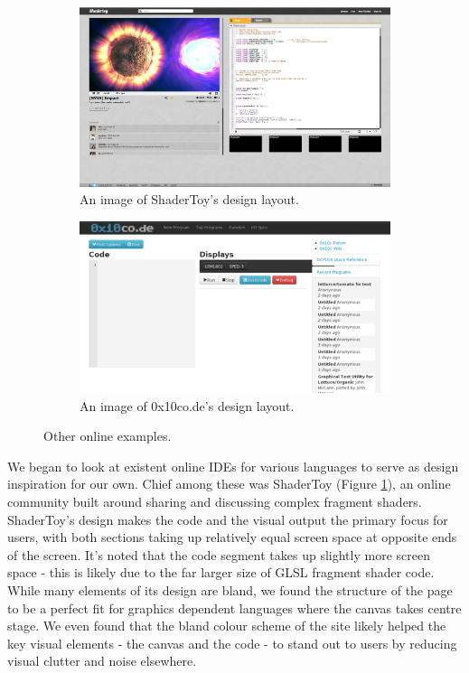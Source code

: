 \documentclass{l3proj}
\begin{document}
\begin{figure}
\centering
\begin{subfigure}[b]{0.45\textwidth}
\includegraphics[width=\textwidth]{images/shadertoy-ide}
\caption{An image of ShaderToy's design layout.}
\label{fig:ide-shadertoy}
\end{subfigure}
\begin{subfigure}[b]{0.45\textwidth}
\includegraphics[width=\textwidth]{images/0x10code}
\caption{An image of 0x10co.de's design layout.}
\label{fig:ide-0x10code}
\end{subfigure}
\caption{Other online examples.}
\label{fig-ide-other}
\end{figure}

We began to look at existent online IDEs for various languages to serve as design inspiration for our own. Chief among these was ShaderToy (Figure \ref{fig:ide-shadertoy}), an online community built around sharing and discussing complex fragment shaders. ShaderToy's design makes the code and the visual output the primary focus for users, with both sections taking up relatively equal screen space at opposite ends of the screen. It's noted that the code segment takes up slightly more screen space - this is likely due to the far larger size of GLSL fragment shader code. While many elements of its design are bland, we found the structure of the page to be a perfect fit for graphics dependent languages where the canvas takes centre stage. We even found that the bland colour scheme of the site likely helped the key visual elements - the canvas and the code - to stand out to users by reducing visual clutter and noise elsewhere.\\
\end{document}

